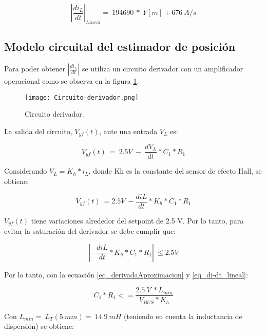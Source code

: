 \noindent 

\begin{equation} \label{eq_di-dt_lineal}
{\left|\frac{{di}_L}{dt}\right|}_{Lineal}=\ 194690\ *\ Y[m]+676\ A/s
\end{equation}

\subsection{Modelo circuital del estimador de posici\'{o}n}

\noindent Para poder obtener $\left|\frac{{di}_L}{dt}\right|$ se utiliza un circuito derivador con un amplificador operacional como se observa en la figura  \ref{fig:img_Circuito-derivador}.

\begin{figure}[H]
	\centering
	\texttt{[image: Circuito-derivador.png]}
	\caption{Circuito derivador.}
	\label{fig:img_Circuito-derivador}
\end{figure}

\noindent La salida del circuito, $V_{yf}(t)$, ante una entrada $V_L$ es:

\begin{equation} \label{eq_vyf1}
	V_{yf}(t)\ =\ 2.5V\ -\ \frac{dV_L}{dt}*C_1*R_1
\end{equation}


\noindent Considerando $V_L=K_h*i_L$, donde Kh es la constante del sensor de efecto Hall, se obtiene: 

\begin{equation} \label{eq_vyf2}
	V_{yf}(t)\ =2.5V\ -\frac{diL}{dt}*K_h*C_1*R_1
\end{equation}

\noindent $V_{yf}(t)$ tiene variaciones alrededor del setpoint de 2.5 V. Por lo tanto, para evitar la saturaci\'{o}n del derivador se debe cumplir que:

\begin{equation} \label{eq_vyf3}
	\left|-\frac{diL}{dt}*K_h*C_1*R_1\right|\ \le 2.5V
\end{equation}

\noindent Por lo tanto, con la ecuaci\'{o}n \ref{eq_derivadaAproximacion} y \ref{eq_di-dt_lineal}:

\begin{equation} \label{eq_condicionC1-R1}
	C_1*R_1<=\frac{2.5\ V\ *L_{min}}{V_{BUS}*K_h}
\end{equation}

\noindent Con $L_{min}=\ L_T(5\ mm)=\ 14.9\ mH$ (teniendo en cuenta la inductancia de dispersi\'{o}n) se obtiene: 

